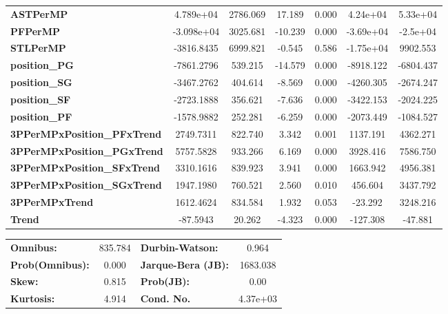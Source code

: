 \begin{center}
\begin{tabular}{lcccccc}
\textbf{ASTPerMP}                   &    4.789e+04  &     2786.069     &    17.189  &         0.000        &     4.24e+04    &     5.33e+04     \\
\textbf{PFPerMP}                    &   -3.098e+04  &     3025.681     &   -10.239  &         0.000        &    -3.69e+04    &     -2.5e+04     \\
\textbf{STLPerMP}                   &   -3816.8435  &     6999.821     &    -0.545  &         0.586        &    -1.75e+04    &     9902.553     \\
\textbf{position\_PG}               &   -7861.2796  &      539.215     &   -14.579  &         0.000        &    -8918.122    &    -6804.437     \\
\textbf{position\_SG}               &   -3467.2762  &      404.614     &    -8.569  &         0.000        &    -4260.305    &    -2674.247     \\
\textbf{position\_SF}               &   -2723.1888  &      356.621     &    -7.636  &         0.000        &    -3422.153    &    -2024.225     \\
\textbf{position\_PF}               &   -1578.9882  &      252.281     &    -6.259  &         0.000        &    -2073.449    &    -1084.527     \\
\textbf{3PPerMPxPosition\_PFxTrend} &    2749.7311  &      822.740     &     3.342  &         0.001        &     1137.191    &     4362.271     \\
\textbf{3PPerMPxPosition\_PGxTrend} &    5757.5828  &      933.266     &     6.169  &         0.000        &     3928.416    &     7586.750     \\
\textbf{3PPerMPxPosition\_SFxTrend} &    3310.1616  &      839.923     &     3.941  &         0.000        &     1663.942    &     4956.381     \\
\textbf{3PPerMPxPosition\_SGxTrend} &    1947.1980  &      760.521     &     2.560  &         0.010        &      456.604    &     3437.792     \\
\textbf{3PPerMPxTrend}              &    1612.4624  &      834.584     &     1.932  &         0.053        &      -23.292    &     3248.216     \\
\textbf{Trend}                      &     -87.5943  &       20.262     &    -4.323  &         0.000        &     -127.308    &      -47.881     \\
\bottomrule
\end{tabular}
\begin{tabular}{lclc}
\textbf{Omnibus:}       & 835.784 & \textbf{  Durbin-Watson:     } &    0.964  \\
\textbf{Prob(Omnibus):} &   0.000 & \textbf{  Jarque-Bera (JB):  } & 1683.038  \\
\textbf{Skew:}          &   0.815 & \textbf{  Prob(JB):          } &     0.00  \\
\textbf{Kurtosis:}      &   4.914 & \textbf{  Cond. No.          } & 4.37e+03  \\
\bottomrule
\end{tabular}
\end{center}

